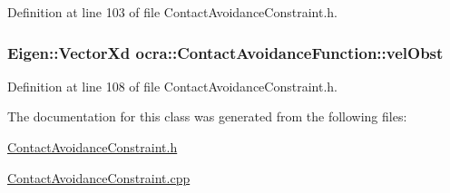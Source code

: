 Definition at line 103 of file Contact\+Avoidance\+Constraint.\+h.

\subsubsection[{\texorpdfstring{vel\+Obst}{velObst}}]{\setlength{\rightskip}{0pt plus 5cm}Eigen\+::\+Vector\+Xd ocra\+::\+Contact\+Avoidance\+Function\+::vel\+Obst\hspace{0.3cm}{\ttfamily [protected]}}\hypertarget{classocra_1_1ContactAvoidanceFunction_a19eb96ace3a217e5ea1c80dec97eeeb2}{}\label{classocra_1_1ContactAvoidanceFunction_a19eb96ace3a217e5ea1c80dec97eeeb2}


Definition at line 108 of file Contact\+Avoidance\+Constraint.\+h.



The documentation for this class was generated from the following files\+:\begin{DoxyCompactItemize}
\item 
\hyperlink{ContactAvoidanceConstraint_8h}{Contact\+Avoidance\+Constraint.\+h}\item 
\hyperlink{ContactAvoidanceConstraint_8cpp}{Contact\+Avoidance\+Constraint.\+cpp}\end{DoxyCompactItemize}
